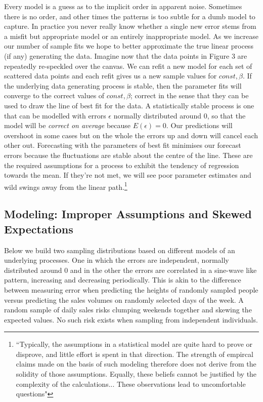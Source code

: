 \documentclass{tufte-handout}
\begin{document}
\noindent Every model is a guess as to the implicit order in apparent noise. Sometimes there is no order, and other times the patterns is too subtle for a dumb model to capture. In practice you never really know whether a single new error stems from a misfit but appropriate model or an entirely inappropriate model. As we increase our number of sample fits we hope to better approximate the true linear process (if any) generating the data. Imagine now that the data points in Figure 3 are repeatedly re-speckled over the canvas. We can refit a new model for each set of scattered data points and each refit gives us a new sample values for $ const, \beta$. If the underlying data generating process is stable, then the parameter fits will converge to the correct values of $const, \beta$; correct in the sense that they can be used to draw the line of best fit for the data. A statistically stable process is one that can be modelled with errors $\epsilon$ normally distributed around $0$, so that the model will be \textit{ correct on average} because $E(\epsilon) = 0$. Our predictions will overshoot in some cases but on the whole the errors up and down will cancel each other out. Forecasting with the parameters of best fit minimises our forecast errors because the fluctuations are stable about the centre of the line. These are the required assumptions for a process to exhibit the tendency of regression towards the mean. If they're not met, we will see poor parameter estimates and wild swings away from the linear path.\footnote{``Typically, the assumptions in a statistical model are quite hard to prove or disprove, and little effort is spent in that direction. The strength of empircal claims made on the basis of such modeling therefore does not derive from the solidity of those assumptions. Equally, these beliefs cannot be justified by the complexity of the calculations... These observations lead to uncomfortable questions"\cite{freedman_2009}}

\subsection{Modeling: Improper Assumptions and Skewed Expectations}

\noindent Below we build two sampling distributions based on different models of an underlying processes.  One in which the errors are independent, normally distributed around $0$ and in the other the errors are correlated in a sine-wave like pattern, increasing and decreasing periodically. This is akin to the difference between measuring error when predicting the heights of randomly sampled people versus predicting the sales volumes on randomly selected days of the week. A random sample of daily sales risks clumping weekends together and skewing the expected values. No such risk exists when sampling from independent individuals. 
\end{document}
